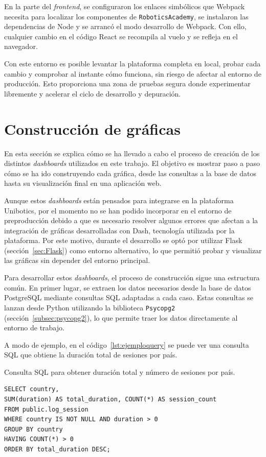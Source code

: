 \documentclass[a4paper, 12pt]{book}
\begin{document}
En la parte del \textit{frontend}, se configuraron los enlaces simbólicos que Webpack necesita para localizar los componentes de \texttt{RoboticsAcademy}, se instalaron las dependencias de Node y se arrancó el modo desarrollo de Webpack. Con ello, cualquier cambio en el código React se recompila al vuelo y se refleja en el navegador.

Con este entorno es posible levantar la plataforma completa en local, probar cada cambio y comprobar al instante cómo funciona, sin riesgo de afectar al entorno de producción. Esto proporciona una zona de pruebas segura donde experimentar libremente y acelerar el ciclo de desarrollo y depuración.


\section{Construcción de gráficas}

En esta sección se explica cómo se ha llevado a cabo el proceso de creación de los distintos \textit{dashboards} utilizados en este trabajo. El objetivo es mostrar paso a paso cómo se ha ido construyendo cada gráfica, desde las consultas a la base de datos hasta su visualización final en una aplicación web.

Aunque estos \textit{dashboards} están pensados para integrarse en la plataforma Unibotics, por el momento no se han podido incorporar en el entorno de preproducción debido a que es necesario resolver algunos errores que afectan a la integración de gráficas desarrolladas con Dash, tecnología utilizada por la plataforma. Por este motivo, durante el desarrollo se optó por utilizar Flask (sección~\ref{sec:Flask}) como entorno alternativo, lo que permitió probar y visualizar las gráficas sin depender del entorno principal.

Para desarrollar estos \textit{dashboards}, el proceso de construcción sigue una estructura común. En primer lugar, se extraen los datos necesarios desde la base de datos PostgreSQL mediante consultas SQL adaptadas a cada caso. Estas consultas se lanzan desde Python utilizando la biblioteca \texttt{Psycopg2} (sección~\ref{subsec:psycopg2}), lo que permite traer los datos directamente al entorno de trabajo.

A modo de ejemplo, en el código~\ref{lst:ejemploquery} se puede ver una consulta SQL que obtiene la duración total de sesiones por país.

\begin{listing}[h!]
\caption{Consulta SQL para obtener duración total y número de sesiones por país.}
\label{lst:ejemploquery}
\begin{verbatim}
SELECT country,
SUM(duration) AS total_duration, COUNT(*) AS session_count
FROM public.log_session
WHERE country IS NOT NULL AND duration > 0
GROUP BY country
HAVING COUNT(*) > 0
ORDER BY total_duration DESC;
\end{verbatim}
\end{listing}
\end{document}
